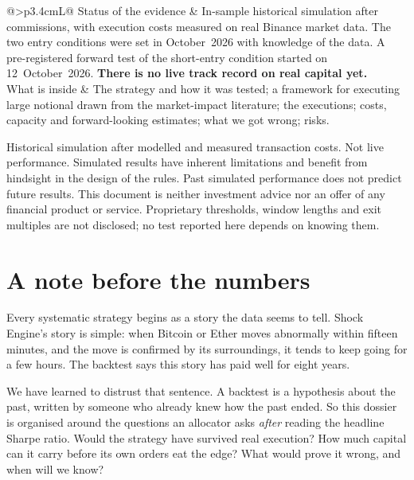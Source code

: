 \documentclass[11pt,a4paper]{article}
\begin{document}
\begin{titlepage}
\vspace{0.9cm}

{\sffamily\small
\begin{tabularx}{\textwidth}{@{}>{\bfseries\color{navy}}p{3.4cm}L@{}}
Status of the evidence & In-sample historical simulation after commissions, with execution costs measured on real
  Binance market data. The two entry conditions were set in October~2026 with knowledge of the data. A pre-registered forward
  test of the short-entry condition started on 12~October~2026. \textbf{There is no live track record on real capital yet.}\\[3pt]
What is inside & The strategy and how it was tested; a framework for executing large notional drawn from the market-impact
  literature; the \NExec{} executions; costs, capacity and forward-looking estimates; what we got wrong; risks.\\
\end{tabularx}}

\vfill
{\sffamily\scriptsize\color{muted}
Historical simulation after modelled and measured transaction costs. Not live performance. Simulated results have inherent
limitations and benefit from hindsight in the design of the rules. Past simulated performance does not predict future results.
This document is neither investment advice nor an offer of any financial product or service. Proprietary thresholds, window
lengths and exit multiples are not disclosed; no test reported here depends on knowing them.\par}
\end{titlepage}

\section*{A note before the numbers}

Every systematic strategy begins as a story the data seems to tell. Shock Engine's story is simple: when Bitcoin or Ether
moves abnormally within fifteen minutes, and the move is confirmed by its surroundings, it tends to keep going for a few hours.
The backtest says this story has paid well for eight years.

We have learned to distrust that sentence. A backtest is a hypothesis about the past, written by someone who already knew how
the past ended. So this dossier is organised around the questions an allocator asks \emph{after} reading the headline Sharpe
ratio. Would the strategy have survived real execution? How much capital can it carry before its own orders eat the edge?
What would prove it wrong, and when will we know?
\end{document}
